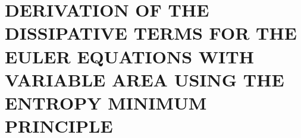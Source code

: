 %
%
%



\chapter{\uppercase{Derivation of the dissipative terms for the Euler equations with variable area using the entropy minimum principle}} \label{app:diss_terms}

